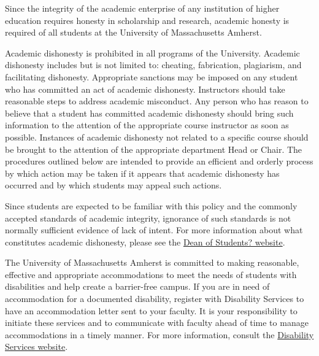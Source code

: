 \documentclass[10pt]{article}
\begin{document}
  
{\footnotesize 
  
\bigskip
{}
Since the integrity of the academic enterprise of any institution of higher education requires honesty in scholarship and research, academic honesty is required of all students at the University of Massachusetts Amherst.

Academic dishonesty is prohibited in all programs of the University. Academic dishonesty includes but is not limited to: cheating, fabrication, plagiarism, and facilitating dishonesty. Appropriate sanctions may be imposed on any student who has committed an act of academic dishonesty. Instructors should take reasonable steps to address academic misconduct. Any person who has reason to believe that a student has committed academic dishonesty should bring such information to the attention of the appropriate course instructor as soon as possible. Instances of academic dishonesty not related to a specific course should be brought to the attention of the appropriate department Head or Chair. The procedures outlined below are intended to provide an efficient and orderly process by which action may be taken if it appears that academic dishonesty has occurred and by which students may appeal such actions.

Since students are expected to be familiar with this policy and the commonly accepted standards of academic integrity, ignorance of such standards is not normally sufficient evidence of lack of intent.
For more information about what constitutes academic dishonesty, please see the \href{http://umass.edu/dean_students/codeofconduct/acadhonesty/}{Dean of Students? website}.

}

{\footnotesize 
\bigskip
{}
The University of Massachusetts Amherst is committed to making reasonable, effective and appropriate accommodations to meet the needs of students with disabilities and help create a barrier-free campus. If you are in need of accommodation for a documented disability, register with Disability Services to have an accommodation letter sent to your faculty. It is your responsibility to initiate these services and to communicate with faculty ahead of time to manage accommodations in a timely manner. For more information, consult the \href{http://www.umass.edu/disability/}{Disability Services website}.
}
\end{document}
